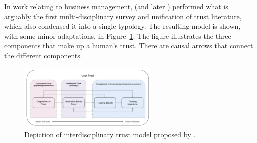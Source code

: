 In work relating to business management, \citet{McKnight1998-ty} (and later \citet{McKnight2001-fa}) performed what is arguably the first multi-disciplinary survey and unification of trust literature, which also condensed it into a single typology. The resulting model is shown, with some minor adaptations, in Figure~\ref{fig:UserTrust}. The figure illustrates the three components that make up a human's trust. There are causal arrows that connect the different components. %

        \begin{figure}[htbp]
            \centering
            \includegraphics[width=0.6\textwidth]{Figures/UserTrust}
            \caption{Depiction of interdisciplinary trust model proposed by \citet{McKnight2001-fa}.} %
            \label{fig:UserTrust}
        \end{figure}

